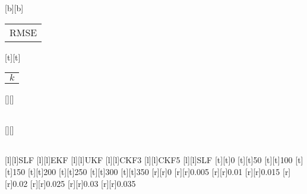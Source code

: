 %
%
[b][b]{\color[rgb]{0,0,0}\setlength{\tabcolsep}{0pt}\begin{tabular}{c}RMSE\end{tabular}}%
[t][t]{\color[rgb]{0,0,0}\setlength{\tabcolsep}{0pt}\begin{tabular}{c}$k$\end{tabular}}%
[][]{\color[rgb]{0,0,0}\setlength{\tabcolsep}{0pt}\begin{tabular}{c} \end{tabular}}%
[][]{\color[rgb]{0,0,0}\setlength{\tabcolsep}{0pt}\begin{tabular}{c} \end{tabular}}%
[l][l]{\color[rgb]{0,0,0}SLF}%
[l][l]{\color[rgb]{0,0,0}EKF}%
[l][l]{\color[rgb]{0,0,0}UKF}%
[l][l]{\color[rgb]{0,0,0}CKF3}%
[l][l]{\color[rgb]{0,0,0}CKF5}%
[l][l]{\color[rgb]{0,0,0}SLF}%
%
[t][t]{0}%
[t][t]{50}%
[t][t]{100}%
[t][t]{150}%
[t][t]{200}%
[t][t]{250}%
[t][t]{300}%
[t][t]{350}%
%
[r][r]{0}%
[r][r]{0.005}%
[r][r]{0.01}%
[r][r]{0.015}%
[r][r]{0.02}%
[r][r]{0.025}%
[r][r]{0.03}%
[r][r]{0.035}%
%
%

